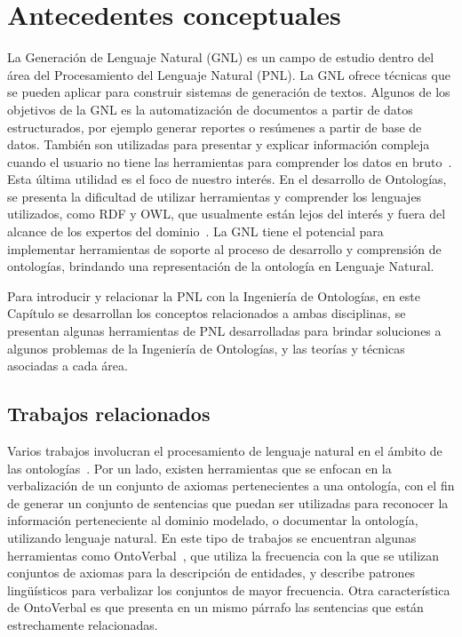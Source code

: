 \chapter{Antecedentes conceptuales}

La Generación de Lenguaje Natural (GNL) es un campo de estudio dentro del área del Procesamiento del Lenguaje Natural (PNL). La GNL ofrece técnicas que se pueden aplicar para construir sistemas de generación de textos. Algunos de los objetivos de la GNL es la automatización de documentos a partir de datos estructurados, por ejemplo generar reportes o resúmenes a partir de base de datos. También son utilizadas para presentar y explicar información compleja cuando el usuario no tiene las herramientas para comprender los datos en bruto~\cite{bernardos2003marco}. Esta última utilidad es el foco de nuestro interés. En el desarrollo de Ontologías, se presenta la dificultad de utilizar herramientas y comprender los lenguajes utilizados, como RDF y OWL, que usualmente están lejos del interés y fuera del alcance de los expertos del dominio~\cite{amaolo2011algunas}. La GNL tiene el potencial para implementar herramientas de soporte al proceso de desarrollo y comprensión de ontologías, brindando una representación de la ontología en Lenguaje Natural.

Para introducir y relacionar la PNL con la Ingeniería de Ontologías, en este Capítulo se desarrollan los conceptos relacionados a ambas disciplinas, se presentan algunas herramientas de PNL desarrolladas para brindar soluciones a algunos problemas de la Ingeniería de Ontologías, y las teorías y técnicas asociadas a cada área. 

\section{Trabajos relacionados}
\label{sec:trabajos_rel}
Varios trabajos involucran el procesamiento de lenguaje natural en el ámbito de las ontologías~\cite{moreno2018ontologia}\cite{perez2002explotacion}\cite{vallez2009web}. Por un lado, existen herramientas que se enfocan en la verbalización de un conjunto de axiomas pertenecientes a una ontología, con el fin de generar un conjunto de sentencias que puedan ser utilizadas para reconocer la información perteneciente al dominio modelado, o documentar la ontología, utilizando lenguaje natural. En este tipo de trabajos se encuentran algunas herramientas como OntoVerbal~\cite{liang2013ontoverbal}, que utiliza la frecuencia con la que se utilizan conjuntos de axiomas para la descripción de entidades, y describe patrones lingüísticos para verbalizar los conjuntos de mayor frecuencia. Otra característica de OntoVerbal es que presenta en un mismo párrafo las sentencias que están estrechamente relacionadas. %

